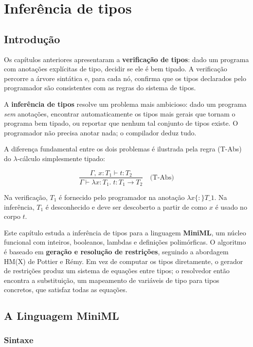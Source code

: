 \chapter{Inferência de tipos}

\section{Introdução}

Os capítulos anteriores apresentaram a \textbf{verificação de tipos}:
dado um programa com anotações explícitas de tipo, decidir se ele é
bem tipado. A verificação percorre a árvore sintática e, para cada
nó, confirma que os tipos declarados pelo programador são
consistentes com as regras do sistema de tipos.

A \textbf{inferência de tipos} resolve um problema mais ambicioso:
dado um programa \emph{sem} anotações, encontrar automaticamente os
tipos mais gerais que tornam o programa bem tipado, ou reportar
que nenhum tal conjunto de tipos existe. O programador não precisa
anotar nada; o compilador deduz tudo.

A diferença fundamental entre os dois problemas é ilustrada pela
regra (T-Abs) do $\lambda$-cálculo simplesmente tipado:

\[ \frac{\Gamma,\, x : T_1 \vdash t : T_2} {\Gamma \vdash \lambda x {:} T_1.\;
t : T_1 \to T_2} \quad\text{(T-Abs)} \]

Na verificação, \(T_1\) é fornecido pelo programador na anotação
\(\lambda x \{:\} T\_1\). Na inferência,
\(T_1\) é desconhecido e deve ser descoberto a partir de como \(x\) é
usado no corpo \(t\).

Este capítulo estuda a inferência de tipos para a linguagem
\textbf{MiniML}, um núcleo funcional com inteiros, booleanos,
lambdas e definições polimórficas. O algoritmo é baseado em
\textbf{geração e resolução de restrições}, seguindo a abordagem
HM(X) de Pottier e Rémy. Em vez de computar os tipos diretamente, o
gerador de restrições produz um sistema de equações entre tipos; o
resolvedor então encontra a substituição, um mapeamento de
variáveis de tipo para tipos concretos, que satisfaz todas as equações.

\section{A Linguagem MiniML}

\subsection{Sintaxe}

